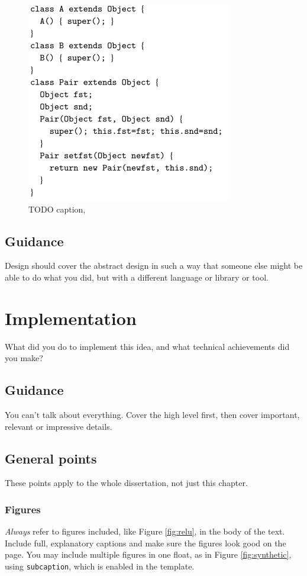 \documentclass{l4proj}
\begin{document}
\begin{figure}
    \centering
    \includegraphics[width=0.4\linewidth]{images/class.PNG}
    \caption{TODO caption, \citep{Igarashi1999}}
    \label{fig:class}
\end{figure}

\section{Guidance}
Design should cover the abstract design in such a way that someone else might be able to do what you did, but with a different language or library or tool.

\chapter{Implementation}
What did you do to implement this idea, and what technical achievements did you make?
\section{Guidance}
You can't talk about everything. Cover the high level first, then cover important, relevant or impressive details.



\section{General points}

These points apply to the whole dissertation, not just this chapter.



\subsection{Figures}
\emph{Always} refer to figures included, like Figure \ref{fig:relu}, in the body of the text. Include full, explanatory captions and make sure the figures look good on the page.
You may include multiple figures in one float, as in Figure \ref{fig:synthetic}, using \texttt{subcaption}, which is enabled in the template.
\end{document}
